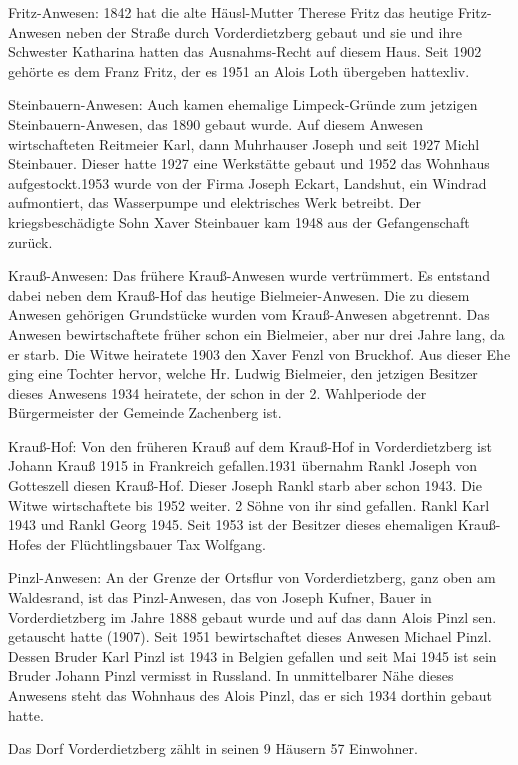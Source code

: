 Fritz-Anwesen: 1842 hat die alte Häusl-Mutter Therese Fritz das heutige
Fritz-Anwesen neben der Straße durch Vorderdietzberg gebaut und sie und ihre
Schwester Katharina hatten das Ausnahms-Recht auf diesem Haus. Seit 1902 gehörte
es dem Franz Fritz, der es 1951 an Alois Loth übergeben hattexliv.

Steinbauern-Anwesen: Auch kamen ehemalige Limpeck-Gründe zum jetzigen
Steinbauern-Anwesen, das 1890 gebaut wurde. Auf diesem Anwesen wirtschafteten
Reitmeier Karl, dann Muhrhauser Joseph und seit 1927 Michl Steinbauer. Dieser
hatte 1927 eine Werkstätte gebaut und 1952 das Wohnhaus aufgestockt.1953 wurde
von der Firma Joseph Eckart, Landshut, ein Windrad aufmontiert, das Wasserpumpe
und elektrisches Werk betreibt. Der kriegsbeschädigte Sohn Xaver Steinbauer kam
1948 aus der Gefangenschaft zurück.

Krauß-Anwesen: Das frühere Krauß-Anwesen wurde vertrümmert. Es entstand dabei
neben dem Krauß-Hof das heutige Bielmeier-Anwesen. Die zu diesem Anwesen
gehörigen Grundstücke wurden vom Krauß-Anwesen abgetrennt. Das Anwesen
bewirtschaftete früher schon ein Bielmeier, aber nur drei Jahre lang, da er
starb. Die Witwe heiratete 1903 den Xaver Fenzl von Bruckhof. Aus dieser Ehe
ging eine Tochter hervor, welche Hr. Ludwig Bielmeier, den jetzigen Besitzer
dieses Anwesens 1934 heiratete, der schon in der 2. Wahlperiode der
Bürgermeister der Gemeinde Zachenberg ist.

Krauß-Hof: Von den früheren Krauß auf dem Krauß-Hof in Vorderdietzberg ist
Johann Krauß 1915 in Frankreich gefallen.1931 übernahm Rankl Joseph von
Gotteszell diesen Krauß-Hof. Dieser Joseph Rankl starb aber schon 1943. Die
Witwe wirtschaftete bis 1952 weiter. 2 Söhne von ihr sind gefallen. Rankl Karl
1943 und Rankl Georg 1945. Seit 1953 ist der Besitzer dieses ehemaligen
Krauß-Hofes der Flüchtlingsbauer Tax Wolfgang.

Pinzl-Anwesen: An der Grenze der Ortsflur von Vorderdietzberg, ganz oben am
Waldesrand, ist das Pinzl-Anwesen, das von Joseph Kufner, Bauer in
Vorderdietzberg im Jahre 1888 gebaut wurde und auf das dann Alois Pinzl sen.
getauscht hatte (1907). Seit 1951 bewirtschaftet dieses Anwesen Michael Pinzl.
Dessen Bruder Karl Pinzl ist 1943 in Belgien gefallen und seit Mai 1945 ist sein
Bruder Johann Pinzl vermisst in Russland. In unmittelbarer Nähe dieses Anwesens
steht das Wohnhaus des Alois Pinzl, das er sich 1934 dorthin gebaut hatte.

Das Dorf Vorderdietzberg zählt in seinen 9 Häusern 57 Einwohner.

